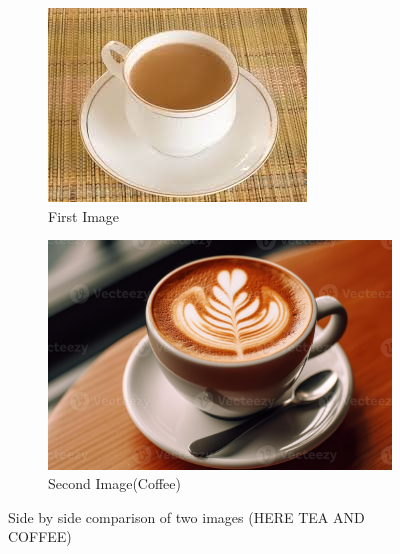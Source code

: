 \documentclass{article}
\begin{document}
\begin{figure}[h]
    \centering
    \begin{subfigure}[b]{0.45\textwidth}
        \centering
        \includegraphics[width=\textwidth]{image1.png} %
        \caption{First Image}
        \label{fig:first(Tea)}
    \end{subfigure}
    \hfill
    \begin{subfigure}[b]{0.45\textwidth}
        \centering
        \includegraphics[width=\textwidth]{image2.png} %
        \caption{Second Image(Coffee)}
        \label{fig:second}
    \end{subfigure}
    \caption{Side by side comparison of two images (HERE TEA AND COFFEE)}
    \label{fig:sidebyside}
\end{figure}
\end{document}
